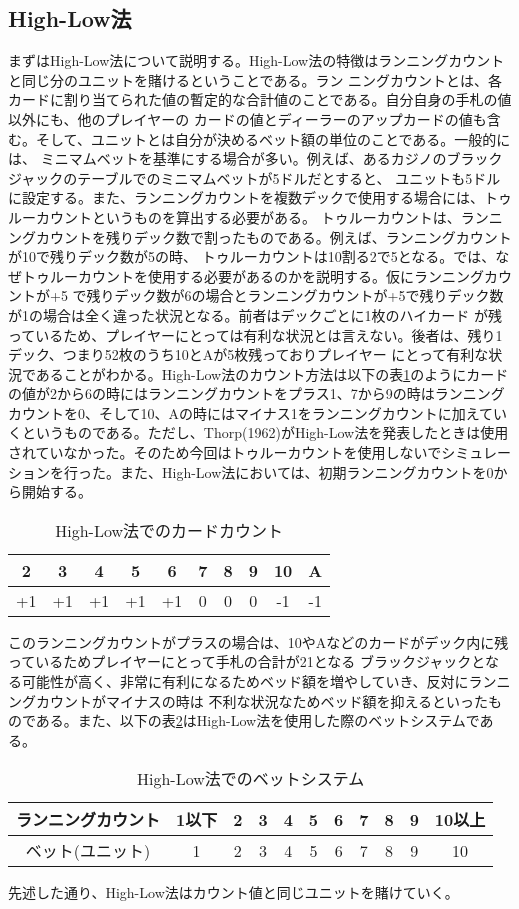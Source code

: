 \subsection{High-Low法}
まずはHigh-Low法について説明する。High-Low法の特徴はランニングカウントと同じ分のユニットを賭けるということである。ラン
ニングカウントとは、各カードに割り当てられた値の暫定的な合計値のことである。自分自身の手札の値以外にも、他のプレイヤーの
カードの値とディーラーのアップカードの値も含む。そして、ユニットとは自分が決めるベット額の単位のことである。一般的には、
ミニマムベットを基準にする場合が多い。例えば、あるカジノのブラックジャックのテーブルでのミニマムベットが5ドルだとすると、
ユニットも5ドルに設定する。また、ランニングカウントを複数デックで使用する場合には、トゥルーカウントというものを算出する必要がある。
トゥルーカウントは、ランニングカウントを残りデック数で割ったものである。例えば、ランニングカウントが10で残りデック数が5の時、
トゥルーカウントは10割る2で5となる。では、なぜトゥルーカウントを使用する必要があるのかを説明する。仮にランニングカウントが+5
で残りデック数が6の場合とランニングカウントが+5で残りデック数が1の場合は全く違った状況となる。前者はデックごとに1枚のハイカード
が残っているため、プレイヤーにとっては有利な状況とは言えない。後者は、残り1デック、つまり52枚のうち10とAが5枚残っておりプレイヤー
にとって有利な状況であることがわかる。High-Low法のカウント方法は以下の表\ref{hlc}のようにカードの値が2から6の時にはランニングカウントをプラス1、7から9の時はランニングカウントを0、そして10、Aの時にはマイナス1をランニングカウントに加えていくというものである。ただし、Thorp(1962)がHigh-Low法を発表したときは使用されていなかった。そのため今回はトゥルーカウントを使用しないでシミュレーションを行った。また、High-Low法においては、初期ランニングカウントを0から開始する。
  \begin{table}[H]
    \centering
    \caption{High-Low法でのカードカウント}
      \label{hlc}
    \begin{tabular}{|c|c|c|c|c|c|c|c|c|c|} \hline
      2&3&4&5&6&7&8&9&10&A \\ \hline
      +1&+1&+1&+1&+1&0&0&0&-1&-1 \\ \hline
    \end{tabular}
  \end{table}
このランニングカウントがプラスの場合は、10やAなどのカードがデック内に残っているためプレイヤーにとって手札の合計が21となる
ブラックジャックとなる可能性が高く、非常に有利になるためベッド額を増やしていき、反対にランニングカウントがマイナスの時は
不利な状況なためベッド額を抑えるといったものである。また、以下の表\ref{hlb}はHigh-Low法を使用した際のベットシステムである。
  \begin{table}[H]
    \centering
    \caption{High-Low法でのベットシステム}
     \label{hlb}
    \begin{tabular}{|c|c|c|c|c|c|c|c|c|c|c|} \hline
      ランニングカウント&1以下&2&3&4&5&6&7&8&9&10以上 \\ \hline
      ベット(ユニット)&1&2&3&4&5&6&7&8&9&10 \\ \hline
    \end{tabular}
  \end{table}
先述した通り、High-Low法はカウント値と同じユニットを賭けていく。

